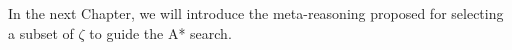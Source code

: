 


%
%

In the next Chapter, we will introduce the meta-reasoning proposed for selecting a subset of $\zeta$ to guide the A* search.

\clearpage